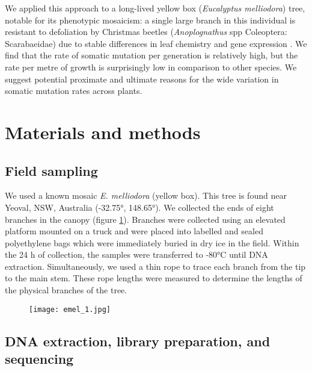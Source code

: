 We applied this approach to a long-lived yellow box (\textit{Eucalyptus melliodora}) tree, notable for its phenotypic mosaicism: a single large branch in this individual is resistant to defoliation by Christmas beetles (\textit{Anoplognathus} spp Coleoptera: Scarabaeidae) due to stable differences in leaf chemistry and gene expression \parencite{padovan_differences_2013, edwards_mosaic_1990}. We find that the rate of somatic mutation per generation is relatively high, but the rate per metre of growth is surprisingly low in comparison to other species. We suggest potential proximate and ultimate reasons for the wide variation in somatic mutation rates across plants.


\section{Materials and methods}

\subsection{Field sampling}

We used a known mosaic \textit{E. melliodora} (yellow box). This tree is found near Yeoval, NSW, Australia (-32.75°, 148.65°). We collected the ends of eight branches in the canopy (figure \ref{fig:emel_1}). Branches were collected using an elevated platform mounted on a truck and were placed into labelled and sealed polyethylene bags which were immediately buried in dry ice in the field. Within the 24 h of collection, the samples were transferred to -80°C until DNA extraction. Simultaneously, we used a thin rope to trace each branch from the tip to the main stem. These rope lengths were measured to determine the lengths of the physical branches of the tree. 

\begin{figure}
\texttt{[image: emel\_1.jpg]}
\label{fig:emel_1}
\end{figure}

\subsection{DNA extraction, library preparation, and sequencing}

